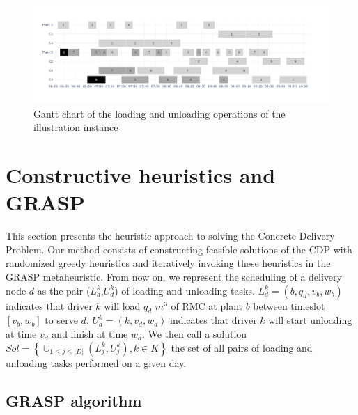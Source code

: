 \documentclass{article}
\begin{document}
\begin{figure}[htb]
    \centering
    \caption{Gantt chart of the loading and unloading operations of the illustration instance}
    \label{fig:plants_schedules}
        \includegraphics[width=\linewidth]{exemple.pdf}
\end{figure}

\section{Constructive heuristics and GRASP}
\label{sec:cdp_grasp_method}

This section presents the heuristic approach to solving the Concrete Delivery Problem. Our method consists of constructing feasible solutions of the CDP with randomized greedy heuristics and iteratively invoking these heuristics in the GRASP metaheuristic. From now on, we represent the scheduling of a delivery node $d$ as the pair ($L^k_{d}$,$U^k_{d}$) of loading and unloading tasks. $L^k_{d} = \left(b,q_d,v_b,w_b\right)$ indicates that driver $k$ will load $q_d$ $m^3$ of RMC at plant $b$ between timeslot $\left[v_b,w_b\right]$ to serve $d$. $U^k_{d} = \left(k,v_d, w_d\right)$ indicates that driver $k$ will start unloading at time $v_d$ and finish at time $w_d$. We then call a solution $Sol =\left\lbrace \cup _{1 \leq j \leq |D|} (L^k_{j}, U^k_{j}), k \in K \right\rbrace$ the set of all pairs of loading and unloading tasks performed on a given day.

\subsection{GRASP algorithm}
\end{document}
